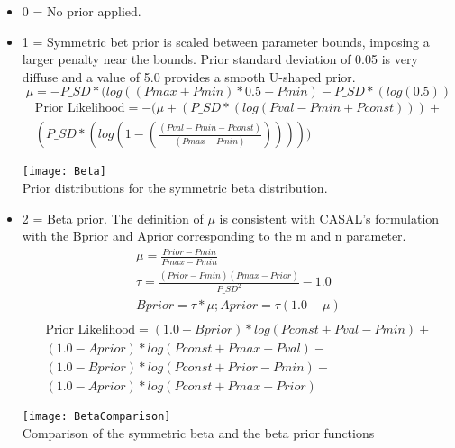 \begin{itemize}
	\item  0 = No prior applied.
	\item  1 = Symmetric bet prior is scaled between parameter bounds, imposing a larger penalty near the bounds.  Prior standard deviation of 0.05 is very diffuse and a value of 5.0 provides a smooth U-shaped prior.
	\begin{equation}  \mu = -P\_SD*(log((Pmax+Pmin)*0.5-Pmin)-P\_SD*(log(0.5)) \end{equation}
	\begin{equation}
		\begin{split}
			\text{Prior Likelihood} = -(\mu + (P\_SD*(log(Pval-Pmin+Pconst))) + \\
			(P\_SD*(log(1-(\frac{(Pval-Pmin-Pconst)}{(Pmax-Pmin)})))))
		\end{split}
	\end{equation}

	\begin{center}
			\texttt{[image: Beta]}\\
			Prior distributions for the symmetric beta distribution.
	\end{center}

	\item 2 = Beta prior.  The definition of $\mu$ is consistent with CASAL's formulation with the Bprior and Aprior corresponding to the m and n parameter.
	\begin{equation}
		\begin{split}
			\mu = \frac{Prior-Pmin}{Pmax-Pmin} \\
			\tau  = \frac{(Prior-Pmin)(Pmax-Prior)}{P\_SD^2}-1.0\\
			Bprior  = \tau*\mu; Aprior = \tau (1.0-\mu)\\
		\end{split}
	\end{equation}
		\begin{equation}
		\begin{split}
		\text{Prior Likelihood} = (1.0-Bprior)*log(Pconst+Pval-Pmin) + \\
		(1.0-Aprior)*log(Pconst+Pmax-Pval) - \\
		(1.0-Bprior)*log(Pconst + Prior - Pmin) - \\
		(1.0-Aprior)*log(Pconst + Pmax - Prior)
		\end{split}
	\end{equation}

	\begin{center}
		\texttt{[image: BetaComparison]}\\
		Comparison of the symmetric beta and the beta prior functions
	\end{center}


\end{itemize}
